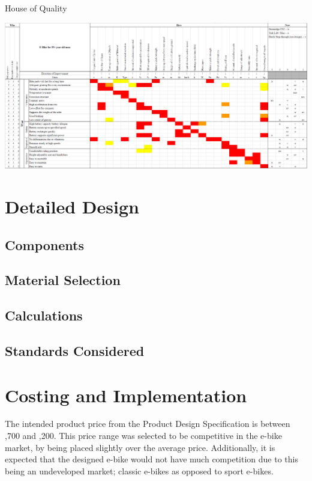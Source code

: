 \documentclass[a4paper,11pt]{article}
\begin{document}
\thispagestyle{empty}
\begin{landscape}

\begin{table}[ht]
	\centering
	\caption{House of Quality}
	\includegraphics[width=1.45\textwidth]{Hoq}
	\label{tab:hoq}
\end{table}

\end{landscape}
\restoregeometry

\section{Detailed Design}

\subsection{Components}

\subsection{Material Selection}

\subsection{Calculations}

\subsection{Standards Considered}

\section{Costing and Implementation}

The intended product price from the Product Design Specification is between ,700 and ,200. This price range was selected to be competitive in the e-bike market, by being placed slightly over the average price. Additionally, it is expected that the designed e-bike would not have much competition due to this being an undeveloped market; classic e-bikes as opposed to sport e-bikes. 
\end{document}
